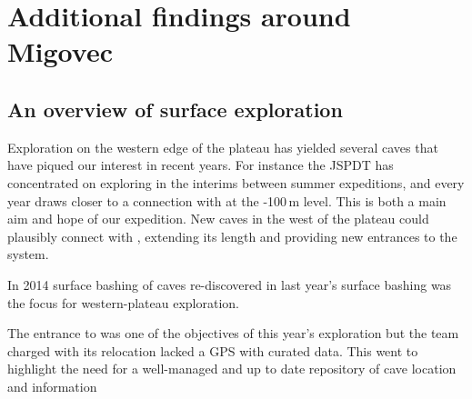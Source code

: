 \section{Additional findings around Migovec}

\subsection{An overview of surface exploration}

Exploration on the western edge of the plateau has yielded several caves that have piqued our interest in recent years. For instance the JSPDT has concentrated on exploring  in the interims between summer expeditions, and every year draws closer to a connection with  at the -100\,m level. This is both a main aim and hope of our expedition. New caves in the west of the plateau could plausibly connect with , extending its length and providing new entrances to the system.

In 2014 surface bashing of caves re-discovered in last year's surface bashing was the focus for western-plateau exploration.

\begin{marginfigure}
\checkoddpage \ifoddpage \forcerectofloat \else \forceversofloat \fi
\centering
{}
\caption{The entrance to   was one of the objectives of this year's exploration but the team charged with its relocation lacked a GPS with curated data. This went to highlight the need for a well-managed  and up to date repository of cave location and information }
\label{end of expo}
\end{marginfigure}


